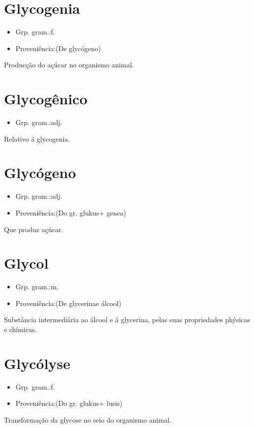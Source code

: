 \section{Glycogenia}
\begin{itemize}
\item {Grp. gram.:f.}
\end{itemize}
\begin{itemize}
\item {Proveniência:(De \textunderscore glycógeno\textunderscore )}
\end{itemize}
Producção do açúcar no organismo animal.
\section{Glycogênico}
\begin{itemize}
\item {Grp. gram.:adj.}
\end{itemize}
Relativo á glycogenia.
\section{Glycógeno}
\begin{itemize}
\item {Grp. gram.:adj.}
\end{itemize}
\begin{itemize}
\item {Proveniência:(Do gr. \textunderscore glukus\textunderscore  + \textunderscore genea\textunderscore )}
\end{itemize}
Que produz açúcar.
\section{Glycol}
\begin{itemize}
\item {Grp. gram.:m.}
\end{itemize}
\begin{itemize}
\item {Proveniência:(De \textunderscore glycerina\textunderscore  e \textunderscore álcool\textunderscore )}
\end{itemize}
Substância intermediária ao álcool e á glycerina, pelas suas propriedades phýsicas e chímicas.
\section{Glycólyse}
\begin{itemize}
\item {Grp. gram.:f.}
\end{itemize}
\begin{itemize}
\item {Proveniência:(Do gr. \textunderscore glukus\textunderscore  + \textunderscore lusis\textunderscore )}
\end{itemize}
Transformação da glycose no seio do organismo animal.
